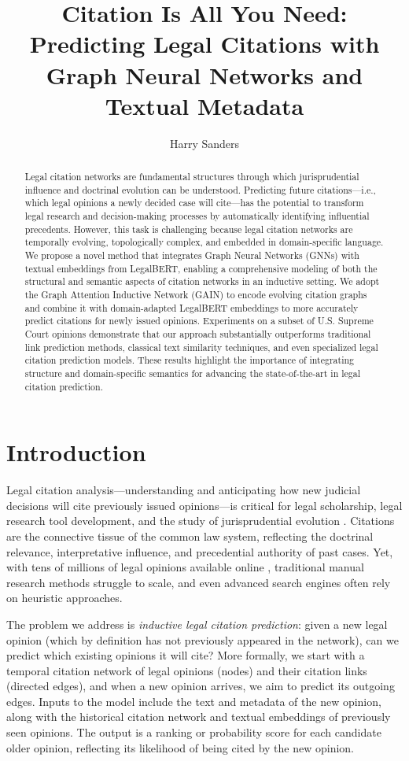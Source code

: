 \documentclass{article}
\title{Citation Is All You Need:\\ Predicting Legal Citations with Graph Neural Networks and Textual Metadata}
\author{Harry Sanders}
\begin{document}
\maketitle

\begin{abstract}
Legal citation networks are fundamental structures through which jurisprudential influence and doctrinal evolution can be understood. Predicting future citations—i.e., which legal opinions a newly decided case will cite—has the potential to transform legal research and decision-making processes by automatically identifying influential precedents. However, this task is challenging because legal citation networks are temporally evolving, topologically complex, and embedded in domain-specific language. We propose a novel method that integrates Graph Neural Networks (GNNs) with textual embeddings from LegalBERT, enabling a comprehensive modeling of both the structural and semantic aspects of citation networks in an inductive setting. We adopt the Graph Attention Inductive Network (GAIN) to encode evolving citation graphs and combine it with domain-adapted LegalBERT embeddings to more accurately predict citations for newly issued opinions. Experiments on a subset of U.S. Supreme Court opinions demonstrate that our approach substantially outperforms traditional link prediction methods, classical text similarity techniques, and even specialized legal citation prediction models. These results highlight the importance of integrating structure and domain-specific semantics for advancing the state-of-the-art in legal citation prediction.
\end{abstract}

\section{Introduction}
Legal citation analysis—understanding and anticipating how new judicial decisions will cite previously issued opinions—is critical for legal scholarship, legal research tool development, and the study of jurisprudential evolution \citep{fowler2007network, post2000fractal}. Citations are the connective tissue of the common law system, reflecting the doctrinal relevance, interpretative influence, and precedential authority of past cases. Yet, with tens of millions of legal opinions available online \citep{hall_judicial_2006}, traditional manual research methods struggle to scale, and even advanced search engines often rely on heuristic approaches.

The problem we address is \emph{inductive legal citation prediction}: given a new legal opinion (which by definition has not previously appeared in the network), can we predict which existing opinions it will cite? More formally, we start with a temporal citation network of legal opinions (nodes) and their citation links (directed edges), and when a new opinion arrives, we aim to predict its outgoing edges. Inputs to the model include the text and metadata of the new opinion, along with the historical citation network and textual embeddings of previously seen opinions. The output is a ranking or probability score for each candidate older opinion, reflecting its likelihood of being cited by the new opinion.
\end{document}
